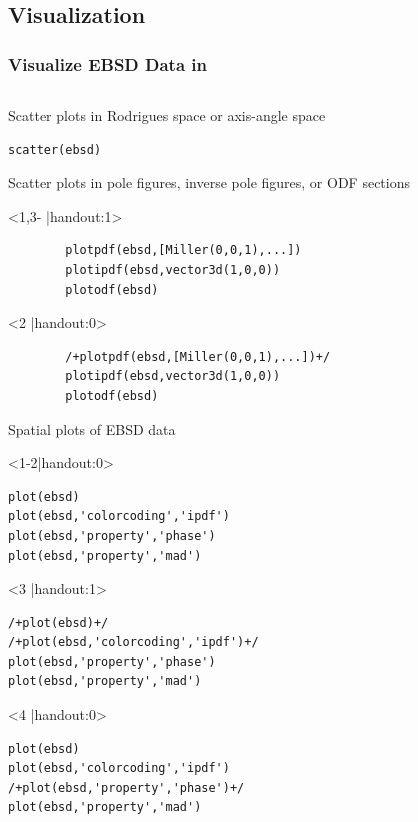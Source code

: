 \subsection*{Visualization}

\begin{frame}[fragile]
  \frametitle{Visualize EBSD Data in \MTEX}

  \begin{columns}
    \begin{column}{8.5cm}

Scatter plots in Rodrigues space or axis-angle space

\begin{lstlisting}
scatter(ebsd)
\end{lstlisting}

\pause

Scatter plots in pole figures, inverse pole figures, or ODF sections


\begin{onlyenv}<1,3- |handout:1>
\begin{lstlisting}
		plotpdf(ebsd,[Miller(0,0,1),...])
		plotipdf(ebsd,vector3d(1,0,0))
		plotodf(ebsd)
\end{lstlisting}
\end{onlyenv}

\begin{onlyenv}<2 |handout:0>
\begin{lstlisting}
		/+plotpdf(ebsd,[Miller(0,0,1),...])+/
		plotipdf(ebsd,vector3d(1,0,0))
		plotodf(ebsd)
\end{lstlisting}
\end{onlyenv}

\pause

Spatial plots of EBSD data

\begin{onlyenv}<1-2|handout:0>
\begin{lstlisting}
plot(ebsd)
plot(ebsd,'colorcoding','ipdf')
plot(ebsd,'property','phase')
plot(ebsd,'property','mad')
\end{lstlisting}
\end{onlyenv}

\begin{onlyenv}<3 |handout:1>
\begin{lstlisting}
/+plot(ebsd)+/
/+plot(ebsd,'colorcoding','ipdf')+/
plot(ebsd,'property','phase')
plot(ebsd,'property','mad')
\end{lstlisting}
\end{onlyenv}

\begin{onlyenv}<4 |handout:0>
\begin{lstlisting}
plot(ebsd)
plot(ebsd,'colorcoding','ipdf')
/+plot(ebsd,'property','phase')+/
plot(ebsd,'property','mad')
\end{lstlisting}
\end{onlyenv}


\end{column}
\end{columns}
\end{frame}
